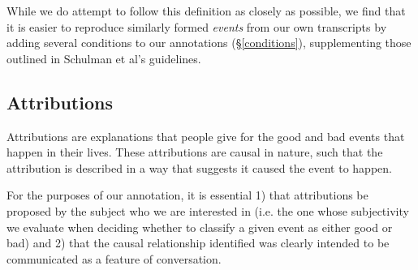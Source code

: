 \documentclass[a4paper,12pt]{article}
\newcommand{\ra}[1]{\renewcommand{\arraystretch}{#1}}
\newcounter{magicrownumbers}
\newcommand\rownumber{\refstepcounter{magicrownumbers}\arabic{magicrownumbers}}
\begin{document}
While we do attempt to follow this definition as closely as possible, we find that it is easier to reproduce similarly formed \emph{events} from our own transcripts by adding several conditions to our annotations (\S \ref{conditions}), supplementing those outlined in Schulman et al's guidelines.

\pagebreak
\subsection{Attributions}

Attributions are explanations that people give for the good and bad events that happen in their lives. These attributions are causal in nature, such that the attribution is described in a way that suggests it caused the event to happen.

For the purposes of our annotation, it is essential 1) that attributions be proposed by the subject who we are interested in (i.e. the one whose subjectivity we evaluate when deciding whether to classify a given event as either good or bad) and 2) that the causal relationship identified was clearly intended to be communicated as a feature of conversation.

%
\end{document}
